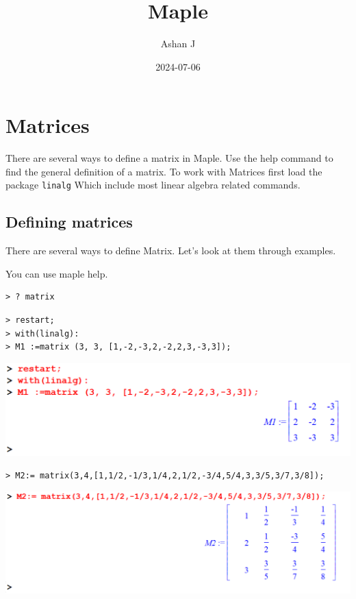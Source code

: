\documentclass[
]{book}
\title{Maple}
\author{Ashan J}
\date{2024-07-06}
\theoremstyle{definition}
\theoremstyle{definition}
\theoremstyle{definition}
\theoremstyle{definition}
\theoremstyle{remark}
\begin{document}
\maketitle

{
\setcounter{tocdepth}{1}
\tableofcontents
}
\chapter{Matrices}\label{matrices}

There are several ways to define a matrix in Maple.
Use the help command to find the general definition of a matrix.
To work with Matrices first load the package \texttt{linalg} Which include most linear algebra related commands.

\section{Defining matrices}\label{defining-matrices}

There are several ways to define Matrix. Let's look at them through examples.

You can use maple help.

\begin{verbatim}
> ? matrix
\end{verbatim}

\begin{verbatim}
> restart;
> with(linalg):
> M1 :=matrix (3, 3, [1,-2,-3,2,-2,2,3,-3,3]);
\end{verbatim}

\includegraphics{figures/Lesson 4/fig1.png}

\begin{verbatim}
> M2:= matrix(3,4,[1,1/2,-1/3,1/4,2,1/2,-3/4,5/4,3,3/5,3/7,3/8]);
\end{verbatim}

\includegraphics{figures/Lesson 4/fig2.png}
\end{document}
